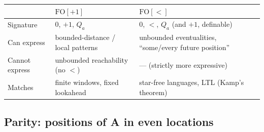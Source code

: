 \begin{center}
\begin{tabular}{@{}p{3.2cm}p{4.6cm}p{4.6cm}@{}}
\toprule
 & $\text{FO}[+1]$ & $\text{FO}[<]$ \\
\midrule
Signature & $0$, $+1$, $Q_a$ & $0$, $<$, $Q_a$ (and $+1$, definable) \\
Can express & bounded-distance / local patterns & unbounded eventualities, ``some/every future position'' \\
Cannot express & unbounded reachability (no $<$) & --- (strictly more expressive) \\
Matches & finite windows, fixed lookahead & star-free languages, LTL (Kamp's theorem) \\
\bottomrule
\end{tabular}
\end{center}

\subsection{Parity: positions of A in even locations}
\label{sec:s1s-parity}

